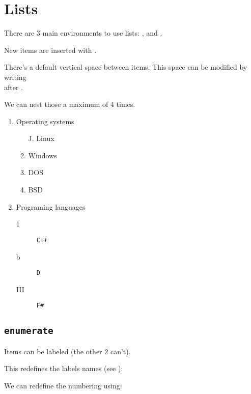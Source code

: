 \section{Lists}

There are 3 main environments to use lists: , 
and .

New items are inserted with \coden{\item[sym]}. 

There's a default vertical space between items.
This space can be modified by writing\\ \code{\setlength{\itemsep}{5mm}} after \code{\begin{env}}.
  
\smallskip
We can nest those a maximum of 4 times.

\begin{example}
\begin{enumerate}
  \item Operating systems
  \begin{enumerate}\setlength{\itemsep}{0mm}
  \item[J.] Linux
  \item Windows
  \item DOS
  \item BSD
  \end{enumerate}
\item Programing languages
  \begin{description}
    \item[1] \texttt{C++}
    \item[b] \texttt{D}
    \item[III] \texttt{F\#}
  \end{description}
\end{enumerate}
\end{example}


\subsection{\texttt{enumerate}}
Items can be labeled (the other 2 can't).

This redefines the labels names (see ):
\begin{latex}
\renewcommand{\labelenumi}{\Roman{enumi}.}
\renewcommand{\labelenumii}{(\arabic{enumii})}
\renewcommand{\labelenumiii}{(\alph{enumiii})}
\renewcommand{\labelenumiv}{(\roman{enumiv})}
\end{latex}

We can redefine the numbering using:
\begin{latex}
\renewcommand{\theenumi}{\Roman{enumi}.}
\renewcommand{\theenumii}{(\arabic{enumii})}
\renewcommand{\theenumiii}{(\alph{enumiii})}
\renewcommand{\theenumiv}{(\roman{enumiv})}
\end{latex}

